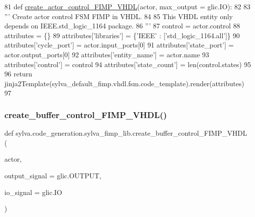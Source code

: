 \begin{DoxyCode}
81   \textcolor{keyword}{def }\hyperlink{namespacesylva_1_1code__generation_1_1sylva__fimp__lib_a04ee93f22621c39841f015d731dad847}{create\_actor\_control\_FIMP\_VHDL}(actor, max\_output = glic.IO):
82 
83     \textcolor{stringliteral}{''' Create actor control FSM FIMP in VHDL.}
84 \textcolor{stringliteral}{}
85 \textcolor{stringliteral}{    This VHDL entity only depends on IEEE.std\_logic\_1164 package.}
86 \textcolor{stringliteral}{    '''}
87     control = actor.control
88     attributes = \{\}
89     attributes[\textcolor{stringliteral}{'libraries'}] = \{\textcolor{stringliteral}{'IEEE'} : [\textcolor{stringliteral}{'std\_logic\_1164.all'}]\}
90     attributes[\textcolor{stringliteral}{'cycle\_port'}] = actor.input\_ports[0]
91     attributes[\textcolor{stringliteral}{'state\_port'}] = actor.output\_ports[0]
92     attributes[\textcolor{stringliteral}{'entity\_name'}] = actor.name
93     attributes[\textcolor{stringliteral}{'control'}] = control
94     attributes[\textcolor{stringliteral}{'state\_count'}] = len(control.states)
95 
96     \textcolor{keywordflow}{return} jinja2Template(sylva\_default\_fimp.vhdl.fsm.code\_template).render(attributes)
97 
\end{DoxyCode}
\mbox{\label{namespacesylva_1_1code__generation_1_1sylva__fimp__lib_a54d6b050b1d37fc82d1a6fdc8090687c}} 
\subsubsection{\texorpdfstring{create\+\_\+buffer\+\_\+control\+\_\+\+F\+I\+M\+P\+\_\+\+V\+H\+D\+L()}{create\_buffer\_control\_FIMP\_VHDL()}}
{\footnotesize\ttfamily def sylva.\+code\+\_\+generation.\+sylva\+\_\+fimp\+\_\+lib.\+create\+\_\+buffer\+\_\+control\+\_\+\+F\+I\+M\+P\+\_\+\+V\+H\+DL (\begin{DoxyParamCaption}\item[{}]{actor,  }\item[{}]{output\+\_\+signal = {\ttfamily glic.OUTPUT},  }\item[{}]{io\+\_\+signal = {\ttfamily glic.IO} }\end{DoxyParamCaption})}

